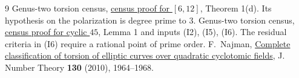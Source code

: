 \documentclass[11pt]{article}
\begin{document}
\begin{thebibliography}{9}
 Genus-two torsion census, \href{https://genus-2-torsion.github.io/proofs/qsimple-612-obstruction.html}{census proof for $[6,12]$}, Theorem 1(d). Its hypothesis on the polarization is degree prime to $3$.
 Genus-two torsion census, \href{https://genus-2-torsion.github.io/proofs/qsimple-45-obstruction.html}{census proof for cyclic $45$}, Lemma 1 and inputs (I2), (I5), (I6). The residual criteria in (I6) require a rational point of prime order.
 F.~Najman, \href{https://doi.org/10.1016/j.jnt.2009.12.008}{Complete classification of torsion of elliptic curves over quadratic cyclotomic fields}, J. Number Theory \textbf{130} (2010), 1964--1968.
\end{thebibliography}
\end{document}
